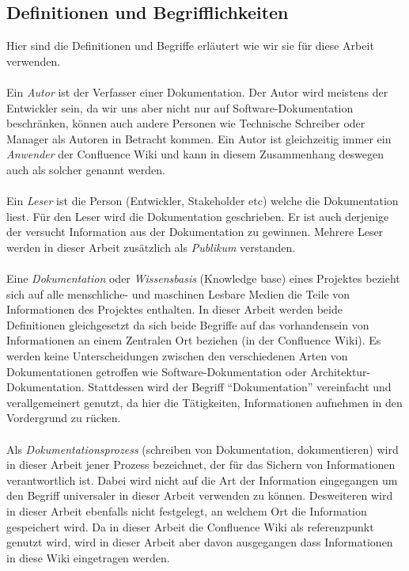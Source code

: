 \documentclass[a4paper,12pt]{scrartcl}
\begin{document}
\subsection{Definitionen und Begrifflichkeiten}
Hier sind die Definitionen und Begriffe erläutert wie wir sie für diese Arbeit verwenden.
\\\\
Ein \textit{Autor} ist der Verfasser einer Dokumentation. Der Autor wird meistens der Entwickler sein, da wir uns aber nicht nur auf Software-Dokumentation beschränken, können auch andere Personen wie Technische Schreiber oder Manager als Autoren in Betracht kommen. Ein Autor ist gleichzeitig immer ein \textit{Anwender} der Confluence Wiki und kann in diesem Zusammenhang deswegen auch als solcher genannt werden.
\\\\
Ein \textit{Leser} ist die Person (Entwickler, Stakeholder etc) welche die Dokumentation liest. Für den Leser wird die Dokumentation geschrieben. Er ist auch derjenige der versucht Information aus der Dokumentation zu gewinnen. Mehrere Leser werden in dieser Arbeit zusätzlich als \textit{Publikum} verstanden.
\\\\
Eine \textit{Dokumentation} oder \textit{Wissensbasis} (Knowledge base) eines Projektes bezieht sich auf alle menschliche- und maschinen Lesbare Medien die Teile von Informationen des Projektes enthalten. In dieser Arbeit werden beide Definitionen gleichgesetzt da sich beide Begriffe auf das vorhandensein von Informationen an einem Zentralen Ort beziehen (in der Confluence Wiki). Es werden keine Unterscheidungen zwischen den verschiedenen Arten von Dokumentationen getroffen wie Software-Dokumentation oder Architektur-Dokumentation. Stattdessen wird der Begriff “Dokumentation” vereinfacht und verallgemeinert genutzt, da hier die Tätigkeiten, Informationen aufnehmen in den Vordergrund zu rücken.
\\\\
Als \textit{Dokumentationsprozess} (schreiben von Dokumentation, dokumentieren) wird in dieser Arbeit jener Prozess bezeichnet, der für das Sichern von Informationen verantwortlich ist. Dabei wird nicht auf die Art der Information eingegangen um den Begriff universaler in dieser Arbeit verwenden zu können. Desweiteren wird in dieser Arbeit ebenfalls nicht festgelegt, an welchem Ort die Information gespeichert wird. Da in dieser Arbeit die Confluence Wiki als referenzpunkt genutzt wird, wird in dieser Arbeit aber davon ausgegangen dass Informationen in diese Wiki eingetragen werden.
\end{document}
